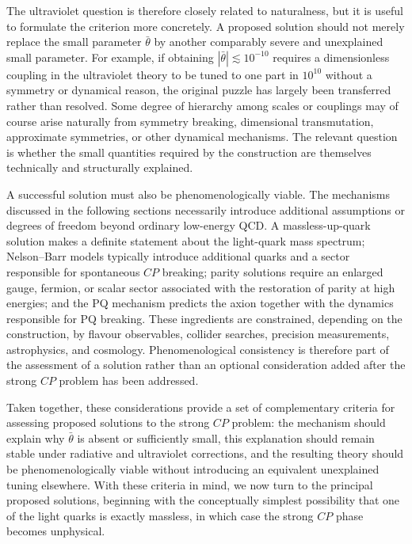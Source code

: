 \documentclass[review]{elsarticle}
\numberwithin{equation}{section}
\numberwithin{table}{section}
\numberwithin{figure}{section}
\begin{document}
The ultraviolet question is therefore closely related to naturalness, but it is useful to formulate the criterion more concretely. A proposed solution should not merely replace the small parameter $\bar\theta$ by another comparably severe and unexplained small parameter. For example, if obtaining $|\bar\theta|\lesssim10^{-10}$ requires a dimensionless coupling in the ultraviolet theory to be tuned to one part in $10^{10}$ without a symmetry or dynamical reason, the original puzzle has largely been transferred rather than resolved. Some degree of hierarchy among scales or couplings may of course arise naturally from symmetry breaking, dimensional transmutation, approximate symmetries, or other dynamical mechanisms. The relevant question is whether the small quantities required by the construction are themselves technically and structurally explained.

A successful solution must also be phenomenologically viable. The mechanisms discussed in the following sections necessarily introduce additional assumptions or degrees of freedom beyond ordinary low-energy QCD. A massless-up-quark solution makes a definite statement about the light-quark mass spectrum; Nelson--Barr models typically introduce additional quarks and a sector responsible for spontaneous $CP$ breaking; parity solutions require an enlarged gauge, fermion, or scalar sector associated with the restoration of parity at high energies; and the PQ mechanism predicts the axion together with the dynamics responsible for PQ breaking. These ingredients are constrained, depending on the construction, by flavour observables, collider searches, precision measurements, astrophysics, and cosmology. Phenomenological consistency is therefore part of the assessment of a solution rather than an optional consideration added after the strong $CP$ problem has been addressed.

Taken together, these considerations provide a set of complementary criteria for assessing proposed solutions to the strong $CP$ problem: the mechanism should explain why $\bar\theta$ is absent or sufficiently small, this explanation should remain stable under radiative and ultraviolet corrections, and the resulting theory should be phenomenologically viable without introducing an equivalent unexplained tuning elsewhere. With these criteria in mind, we now turn to the principal proposed solutions, beginning with the conceptually simplest possibility that one of the light quarks is exactly massless, in which case the strong $CP$ phase becomes unphysical.
\end{document}
